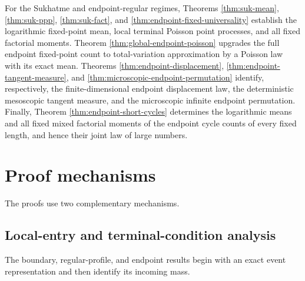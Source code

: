\documentclass[11pt]{article}
\theoremstyle{remark}
\begin{document}
For the Sukhatme and endpoint-regular regimes, Theorems \ref{thm:suk-mean},
\ref{thm:suk-ppp}, \ref{thm:suk-fact}, and
\ref{thm:endpoint-fixed-universality} establish the logarithmic fixed-point
mean, local terminal Poisson point processes, and all fixed factorial moments.
Theorem \ref{thm:global-endpoint-poisson} upgrades the full endpoint fixed-point
count to total-variation approximation by a Poisson law with its exact mean.
Theorems \ref{thm:endpoint-displacement},
\ref{thm:endpoint-tangent-measure}, and
\ref{thm:microscopic-endpoint-permutation} identify, respectively, the
finite-dimensional endpoint displacement law, the deterministic mesoscopic
tangent measure, and the microscopic infinite endpoint permutation.  Finally,
Theorem \ref{thm:endpoint-short-cycles} determines the logarithmic means and all
fixed mixed factorial moments of the endpoint cycle counts of every fixed
length, and hence their joint law of large numbers.

\section{Proof mechanisms}\label{sec:proof-mechanisms}

The proofs use two complementary mechanisms.

\subsection{Local-entry and terminal-condition analysis}

The boundary, regular-profile, and endpoint results begin with an exact event
representation and then identify its incoming mass.
\end{document}
